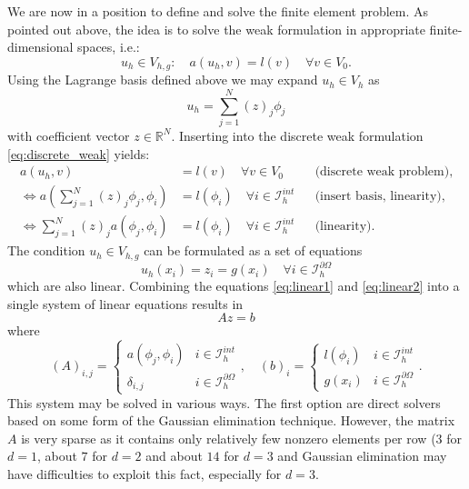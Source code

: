 \documentclass[a4paper,
		     11pt,
		     DIV12,
		     DIVcalc,
		     headings=normal,
		     oneside,
		     bibliography=totoc,
		     headsepline=false,
		     headinclude]{scrartcl}
\begin{document}
We are now in a position to define and solve the finite element problem.
As pointed out above, the idea is to solve the weak formulation in appropriate
finite-dimensional spaces, i.e.:
\begin{equation*}
u_h\in V_{h,g} : \quad a(u_h,v) = l(v) \quad \forall v\in V_0 .
\label{eq:discrete_weak}
\end{equation*}
Using the Lagrange basis defined above we may expand $u_h\in V_h$ as
\begin{equation*}
u_h = \sum_{j=1}^N (z)_j \phi_j
\end{equation*} 
with coefficient vector $z\in\mathbb{R}^N$. Inserting into the
discrete weak formulation \eqref{eq:discrete_weak} yields:
\begin{align}
a(u_h,v) &= l(v) \quad \forall v\in V_0 &&\text{(discrete weak problem)},\nonumber \\
\Leftrightarrow 
a\left(\sum_{j=1}^N (z)_j \phi_j,\phi_i\right) &= l(\phi_i) \quad \forall i\in \mathcal{I}_h^{int} 
&&\text{(insert basis, linearity)}, \nonumber \\
\Leftrightarrow 
\sum_{j=1}^N (z)_j a\left( \phi_j,\phi_i\right) &= l(\phi_i) \quad \forall i\in \mathcal{I}_h^{int} 
&&\text{(linearity)}. \label{eq:linear1}
\end{align}
The condition $u_h\in V_{h,g}$ can be formulated as a set of equations
\begin{equation}
u_h(x_i) = z_i = g(x_i) \quad\forall i\in\mathcal{I}_h^{\partial\Omega}
\label{eq:linear2}
\end{equation}
which are also linear. Combining the equations \eqref{eq:linear1} and \eqref{eq:linear2}
into a single system of linear equations results in
\begin{equation}
A z = b \label{eq:thesystem}
\end{equation}
where
\begin{equation}
(A)_{i,j} = \left\{\begin{array}{ll}
a(\phi_j,\phi_i) & i\in\mathcal{I}_h^{int}\\
\delta_{i,j} & i\in\mathcal{I}_h^{\partial\Omega}
\end{array}\right., \quad
(b)_{i} = \left\{\begin{array}{ll}
l(\phi_i) & i\in\mathcal{I}_h^{int}\\
g(x_i) & i\in\mathcal{I}_h^{\partial\Omega}
\end{array}\right. .
\label{eq:systemdetail}
\end{equation}
This system may be solved in various ways. The first option are direct solvers
based on some form of the Gaussian elimination technique. However, the matrix $A$
is very sparse as it contains only relatively few nonzero elements per row (3 for $d=1$,
about $7$ for $d=2$ and about $14$ for $d=3$ and Gaussian elimination
may have difficulties to exploit this fact, especially for $d=3$.
\end{document}
